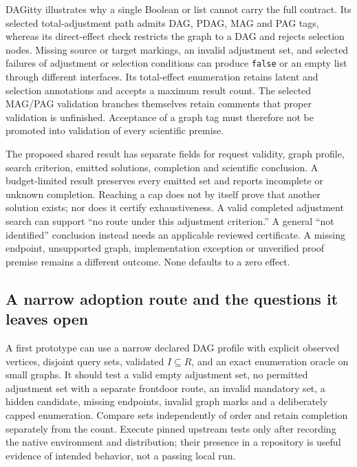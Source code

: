 DAGitty illustrates why a single Boolean or list cannot carry the full
contract. Its selected total-adjustment path admits DAG, PDAG, MAG and PAG
tags, whereas its direct-effect check restricts the graph to a DAG and rejects
selection nodes. Missing source or target markings, an invalid adjustment set,
and selected failures of adjustment or selection conditions can produce
\texttt{false} or an empty list through different interfaces. Its total-effect
enumeration retains latent and selection annotations and accepts a maximum
result count. The selected MAG/PAG validation branches themselves retain
comments that proper validation is unfinished. Acceptance of a graph tag must
therefore not be promoted into validation of every scientific premise.
\citep{exec19_otherid_dagitty}

The proposed shared result has separate fields for request validity, graph
profile, search criterion, emitted solutions, completion and scientific
conclusion. A budget-limited result preserves every emitted set and reports
incomplete or unknown completion. Reaching a cap does not by itself prove that
another solution exists; nor does it certify exhaustiveness. A valid completed
adjustment search can support ``no route under this adjustment criterion.''
A general ``not identified'' conclusion instead needs an applicable reviewed
certificate. A missing endpoint, unsupported graph, implementation exception
or unverified proof premise remains a different outcome. None defaults to a
zero effect.\citep{exec19_otherid_julia,exec19_otherid_dagitty,exec19_otherid_reference}

\subsection{A narrow adoption route and the questions it leaves open}
\label{exec19:otherid-route}
A first prototype can use a narrow declared DAG profile with explicit observed
vertices, disjoint query sets, validated $I\subseteq R$, and an exact
enumeration oracle on small graphs. It should test a valid empty adjustment
set, no permitted adjustment set with a separate frontdoor route, an invalid
mandatory set, a hidden candidate, missing endpoints, invalid graph marks and
a deliberately capped enumeration. Compare sets independently of order and
retain completion separately from the count. Execute pinned upstream tests only
after recording the native environment and distribution; their presence in a
repository is useful evidence of intended behavior, not a passing local run.
\citep{exec19_otherid_julia,exec19_otherid_dagitty}

